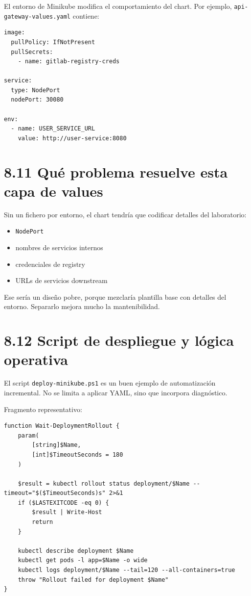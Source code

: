 \documentclass[
a4paper,
12pt]{report}
\providecommand{\tightlist}{%
  \setlength{\itemsep}{0pt}\setlength{\parskip}{0pt}}
\begin{document}
El entorno de Minikube modifica el comportamiento del chart. Por
ejemplo, \texttt{api-gateway-values.yaml} contiene:

\begin{verbatim}
image:
  pullPolicy: IfNotPresent
  pullSecrets:
    - name: gitlab-registry-creds

service:
  type: NodePort
  nodePort: 30080

env:
  - name: USER_SERVICE_URL
    value: http://user-service:8080
\end{verbatim}

\section{8.11 Qué problema resuelve esta capa de
values}\label{quuxe9-problema-resuelve-esta-capa-de-values}

Sin un fichero por entorno, el chart tendría que codificar detalles del
laboratorio:

\begin{itemize}
\tightlist
\item
  \texttt{NodePort}
\item
  nombres de servicios internos
\item
  credenciales de registry
\item
  URLs de servicios downstream
\end{itemize}

Ese sería un diseño pobre, porque mezclaría plantilla base con detalles
del entorno. Separarlo mejora mucho la mantenibilidad.

\section{8.12 Script de despliegue y lógica
operativa}\label{script-de-despliegue-y-luxf3gica-operativa}

El script \texttt{deploy-minikube.ps1} es un buen ejemplo de
automatización incremental. No se limita a aplicar YAML, sino que
incorpora diagnóstico.

Fragmento representativo:

\begin{verbatim}
function Wait-DeploymentRollout {
    param(
        [string]$Name,
        [int]$TimeoutSeconds = 180
    )

    $result = kubectl rollout status deployment/$Name --timeout="$($TimeoutSeconds)s" 2>&1
    if ($LASTEXITCODE -eq 0) {
        $result | Write-Host
        return
    }

    kubectl describe deployment $Name
    kubectl get pods -l app=$Name -o wide
    kubectl logs deployment/$Name --tail=120 --all-containers=true
    throw "Rollout failed for deployment $Name"
}
\end{verbatim}
\end{document}
